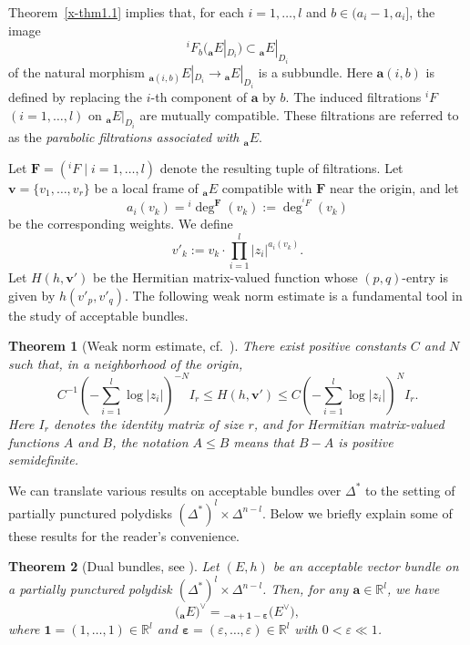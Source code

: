 \documentclass[12pt,twoside]{amsart}
\newtheorem{thm}{Theorem}[section]
\theoremstyle{definition}
\begin{document}
Theorem~\ref{x-thm1.1} implies that, for each $i=1,\ldots,l$ and
$b\in(a_i-1,a_i]$, the image
\[
{}^i\!F_b\bigl({}_{\bm a} E|_{D_i}\bigr)
\subset {}_{\bm a} E|_{D_i}
\]
of the natural morphism
${}_{\bm a(i,b)}E|_{D_i} \to {}_{\bm a}E|_{D_i}$
is a subbundle.
Here $\bm a(i,b)$ is defined by replacing the $i$-th component of
$\bm a$ by $b$.
The induced filtrations ${}^i\!F$ $(i=1,\ldots,l)$ on
${}_{\bm a} E|_{D_i}$ are mutually compatible. 
These filtrations are referred 
to as the \emph{parabolic filtrations 
associated with ${}_{\bm a}E$}. 

Let $\mathbf F = ({}^iF \mid i=1,\ldots,l)$ denote the resulting tuple of
filtrations.
Let $\bm v=\{v_1,\ldots,v_r\}$ be a local 
frame of ${}_{\bm a}E$ compatible with
$\mathbf F$ near the origin, and let 
\[ 
a_i(v_k)={}^i\!\deg^{\mathbf F}(v_k)
:=\deg ^{{}^i\!F}(v_k)
\] 
be the
corresponding weights.
We define
\[
v'_k := v_k \cdot \prod_{i=1}^l |z_i|^{a_i(v_k)} .
\]
Let $H(h,\bm v')$ be the Hermitian matrix-valued function whose $(p,q)$-entry
is given by $h(v'_p,v'_q)$.
The following weak norm estimate is a fundamental tool in the study of
acceptable bundles.

\begin{thm}[{Weak norm estimate, cf.~\cite[Theorem~21.3.2]{mochizuki4}}]
\label{x-thm1.4}
There exist positive constants $C$ and $N$ such that, in a neighborhood
of the origin,
\[
C^{-1}
\left(-\sum_{i=1}^l \log |z_i|\right)^{-N} I_r
\le
H(h,\bm v')
\le
C
\left(-\sum_{i=1}^l \log |z_i|\right)^{N} I_r .
\]
Here $I_r$ denotes the identity matrix of size $r$, and 
for Hermitian matrix-valued functions $A$ and $B$,
the notation $A\le B$ means that $B-A$ is positive semidefinite. 
\end{thm}

We can translate various results on acceptable bundles over $\Delta^*$
to the setting of partially punctured polydisks
$(\Delta^*)^l \times \Delta^{n-l}$. 
Below we briefly explain some of these results for the reader's convenience.

\begin{thm}[{Dual 
bundles, see \cite[Theorem 1.12]{fujino-fujisawa-ono}}]\label{x-thm1.5}
Let $(E, h)$ be an acceptable vector bundle on a partially punctured
polydisk $(\Delta^*)^l \times \Delta^{n-l}$.
Then, for any $\bm a \in \mathbb R^l$, we have
\[
\bigl({}_{\bm a} E\bigr)^\vee
=
{}_{-\bm a + \bm 1 - \bm \varepsilon}\bigl(E^\vee\bigr),
\]
where $\bm 1 = (1,\ldots,1) \in \mathbb R^l$ and
$\bm \varepsilon = (\varepsilon,\ldots,\varepsilon) \in \mathbb R^l$ 
with $0<\varepsilon \ll 1$.
\end{thm}
\end{document}
